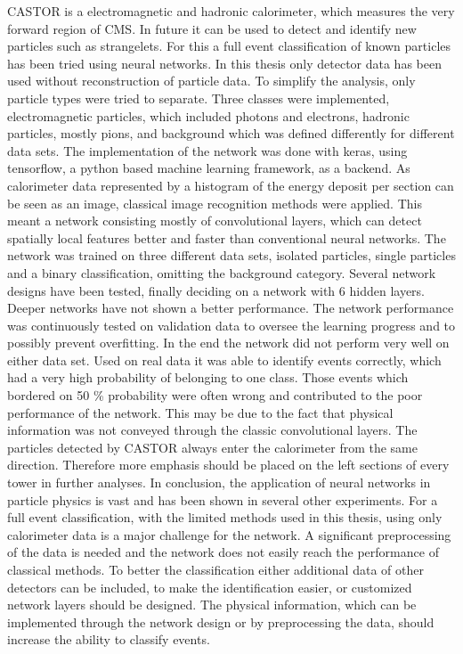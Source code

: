 CASTOR is a electromagnetic and hadronic calorimeter, which measures the very forward region of CMS. In future it can be used to detect and identify new particles such as strangelets. For this a full event classification of known particles has been tried using neural networks. In this thesis only detector data has been used without reconstruction of particle data. To simplify the analysis, only particle types were tried to separate. Three classes were implemented, electromagnetic particles, which included photons and electrons, hadronic particles, mostly pions, and background which was defined differently for different data sets. The implementation of the network was done with keras, using tensorflow, a python based machine learning framework, as a backend. As calorimeter data represented by a histogram of the energy deposit per section can be seen as an image, classical image recognition methods were applied. This meant a network consisting mostly of convolutional layers, which can detect spatially local features better and faster than conventional neural networks. \newline
The network was trained on three different data sets, isolated particles, single particles and a binary classification, omitting the background category. Several network designs have been tested, finally deciding on a network with 6 hidden layers. Deeper networks have not shown a better performance. The network performance was continuously tested on validation data to oversee the learning progress and to possibly prevent overfitting. In the end the network did not perform very well on either data set. Used on real data it was able to identify events correctly, which had a very high probability of belonging to one class. Those events which bordered on 50 \% probability were often wrong and contributed to the poor performance of the network. This may be due to the fact that physical information was not conveyed through the classic convolutional layers. The particles detected by CASTOR always enter the calorimeter from the same direction. Therefore more emphasis should be placed on the left sections of every tower in further analyses. \newline
In conclusion, the application of neural networks in particle physics is vast and has been shown in several other experiments. For a full event classification, with the limited methods used in this thesis, using only calorimeter data is a major challenge for the network. A significant preprocessing of the data is needed and the network does not easily reach the performance of classical methods. To better the classification either additional data of other detectors can be included, to make the identification easier, or customized network layers should be designed. The physical information, which can be implemented through the network design or by preprocessing the data, should increase the ability to classify events. 